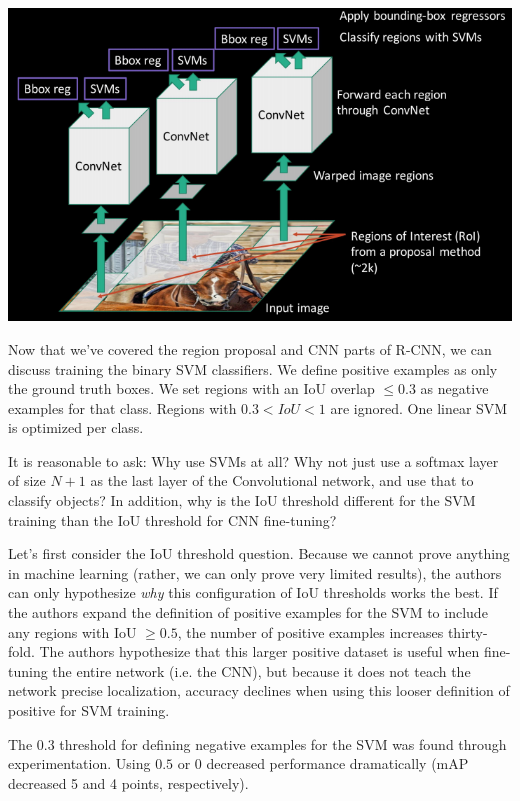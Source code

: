 \documentclass{article}
\begin{document}
\begin{center}
\includegraphics[scale=0.45]{rcnn2.png}
\end{center}


Now that we've covered the region proposal and CNN parts of R-CNN, we can discuss training the binary SVM classifiers. We define positive examples as only the ground truth boxes. We set regions with an IoU overlap $\leq 0.3$ as negative examples for that class. Regions with $0.3<IoU<1$ are ignored. One linear SVM is optimized per class.

It is reasonable to ask: Why use SVMs at all? Why not just use a softmax layer of size $N+1$ as the last layer of the Convolutional network, and use that to classify objects? In addition, why is the IoU threshold different for the SVM training than the IoU threshold for CNN fine-tuning?

Let's first consider the IoU threshold question. Because we cannot prove anything in machine learning (rather, we can only prove very limited results), the authors can only hypothesize \textit{why} this configuration of IoU thresholds works the best. If the authors expand the definition of positive examples for the SVM to include any regions with IoU $\geq 0.5$, the number of positive examples increases thirty-fold. The authors hypothesize that this larger positive dataset is useful when fine-tuning the entire network (i.e. the CNN), but because it does not teach the network precise localization, accuracy declines when using this looser definition of positive for SVM training.

The $0.3$ threshold for defining negative examples for the SVM was found through experimentation. Using $0.5$ or $0$ decreased performance dramatically (mAP decreased 5 and 4 points, respectively).
\end{document}

